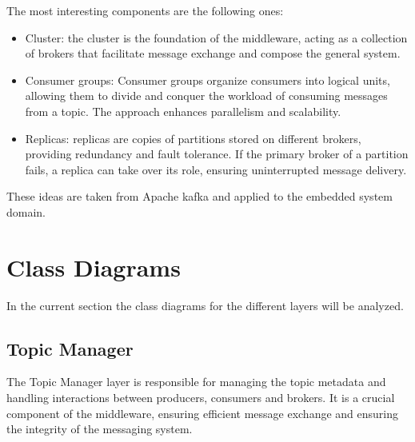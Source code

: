 The most interesting components are the following ones:

\begin{itemize}
    \item   Cluster: the cluster is the foundation of the middleware, acting as
            a collection of brokers that facilitate message exchange and
            compose the general system.
    \item   Consumer groups: Consumer groups organize consumers into logical
            units, allowing them to divide and conquer the workload of
            consuming messages from a topic. The approach enhances parallelism
            and scalability.
    \item   Replicas: replicas are copies of partitions stored on different
            brokers, providing redundancy and fault tolerance. If the primary
            broker of a partition fails, a replica can take over its role,
            ensuring uninterrupted message delivery.
\end{itemize}

These ideas are taken from Apache kafka and applied to the embedded system
domain.

\section{Class Diagrams}

In the current section the class diagrams for the different layers will be
analyzed.

\subsection{Topic Manager}

The Topic Manager layer is responsible for managing the topic metadata and
handling interactions between producers, consumers and brokers. It is a crucial
component of the middleware, ensuring efficient message exchange and ensuring
the integrity of the messaging system.

